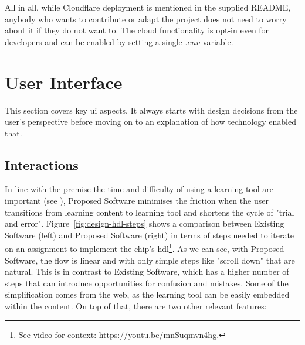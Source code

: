 All in all, while Cloudflare deployment is mentioned in the supplied README, anybody who wants to contribute or adapt the project does not need to worry about it if they do not want to.
The cloud functionality is opt-in even for developers and can be enabled by setting a single $.env$ variable.

\section{User Interface}

This section covers key \gls{ui} aspects.
It always starts with design decisions from the user's perspective before moving on to an explanation of how technology enabled that.

\subsection{Interactions}
\label{sec:ui-interactions}

In line with the premise the time and difficulty of using a learning tool are important (see ), Proposed Software minimises the friction when the user transitions from learning content to learning tool and shortens the cycle of "trial and error".
Figure~\ref{fig:design-hdl-steps} shows a comparison between Existing Software (left) and Proposed Software (right) in terms of steps needed to iterate on an assignment to implement the chip's \gls{hdl}\footnote{See video for context: \url{https://youtu.be/mnSuqmvn4hg}.}.
As we can see, with Proposed Software, the flow is linear and with only simple steps like "scroll down" that are natural.
This is in contrast to Existing Software, which has a higher number of steps that can introduce opportunities for confusion and mistakes.
Some of the simplification comes from the web, as the learning tool can be easily embedded within the content.
On top of that, there are two other relevant features:

